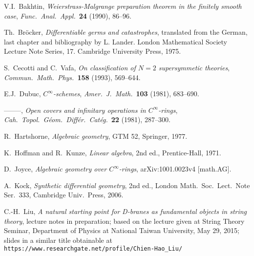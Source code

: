 \documentclass[11pt]{article}
\numberwithin{equation}{subsection}
\begin{document}
\newpage
\baselineskip 13pt
{\footnotesize
\begin{thebibliography}{AAaaaa}

\bibitem[Ba]{} V.I.~Bakhtin,
 {\it Weierstrass-Malgrange preparation theorem in the finitely smooth case},
 {\sl Func.\ Anal.\ Appl.}\ {\bf 24} (1990), 86--96.


\bibitem[Br]{} Th.~Br\"{o}cker,
 {\sl Differentiable germs and catastrophes},
 translated from the German, last chapter and bibliography by L. Lander.
 London Mathematical Society Lecture Note Series, 17.
 Cambridge University Press, 1975.

\bibitem[C-V]{} S.\ Cecotti and C.\ Vafa,
 {\it On classification of $N=2$ supersymmetic theories},
 {\sl Commun.\ Math.\ Phys.}\ {\bf 158} (1993), 569--644.

\bibitem[Du1]{} E.J.\ Dubuc,
 {\it $C^{\infty}$-schemes},
 {\sl Amer.\ J.\ Math.}\ {\bf 103} (1981), 683--690.

\bibitem[Du2]{} --------,
 {\it Open covers and infinitary operations in $C^{\infty}$-rings},
 {\sl Cah.\ Topol.\ G\'{e}om.\ Diff\'{e}r.\ Cat\'{e}g.}\ {\bf 22} (1981), 287--300.

\bibitem[Ha]{} R.\ Hartshorne,
 {\sl Algebraic geometry},
 GTM 52, Springer, 1977.

\bibitem[H-K]{} K.\ Hoffman and R.\ Kunze,
 {\sl Linear algebra}, 2nd ed., Prentice-Hall, 1971.

\bibitem[Jo]{} D.~Joyce,
 {\it Algebraic geometry over $C^{\infty}$-rings},
 arXiv:1001.0023v4 [math.AG].

\bibitem[Ko]{} A.\ Kock,
 {\sl Synthetic differential geometry}, 2nd ed.,
   London Math.\ Soc.\ Lect.\ Note Ser.\  333,
   Cambridge Univ.\ Press, 2006.

\bibitem[Liu]{} C.-H.\ Liu,
{\it A natural starting point for D-branes as fundamental objects in string theory},
  lecture notes in preparation;
  based on the lecture given at
   String Theory Seminar, Department of Physics at National Taiwan University,
   May 29, 2015;
   slides in a similar title obtainable at\\  %
   \verb=https://www.researchgate.net/profile/Chien-Hao_Liu/=


\end{thebibliography}}
\end{document}
